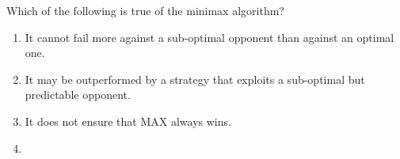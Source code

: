 \documentclass[11pt, a4paper]{exam}
\begin{document}
\begin{quiz}
    \item Which of the following is true of the minimax algorithm?
    \begin{enumerate}[label=$\bigcirc$]
        \item It cannot fail more against a sub-optimal opponent than against an optimal one.
        \item It may be outperformed by a strategy that exploits a sub-optimal but predictable opponent.
        \item It does not ensure that MAX always wins.
        \item {}
    \end{enumerate}
\end{quiz}
\end{document}
